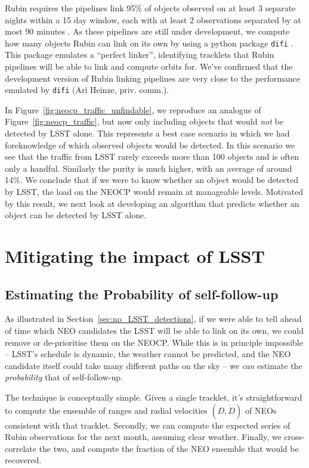 \documentclass[twocolumn]{aastex631}
\begin{document}
Rubin requires the pipelines link 95\% of objects observed on at least 3 separate nights within a 15 day window, each with at least 2 observations separated by at most 90 minutes \citep{oss}. As these pipelines are still under development, we compute how many objects Rubin can link on its own by using a python package \texttt{difi} \citep{difi}. This package emulates a ``perfect linker'', identifying tracklets that Rubin pipelines will be able to link and compute orbits for. We've confirmed that the development version of Rubin linking pipelines are very close to the performance emulated by \texttt{difi} (Ari Heinze, priv. comm.).

In Figure~\ref{fig:neocp_traffic_unfindable}, we reproduce an analogue of Figure~\ref{fig:neocp_traffic}, but now only including objects that would \emph{not} be detected by LSST alone. This represents a best case scenario in which we had foreknowledge of which observed objects would be detected. In this scenario we see that the traffic from LSST rarely exceeds more than 100 objects and is often only a handful. Similarly the purity is much higher, with an average of around 14\%. We conclude that if we were to know whether an object would be detected by LSST, the load on the NEOCP would remain at manageable levels. Motivated by this result, we next look at developing an algorithm that predicts whether an object can be detected by LSST alone.

\section{Mitigating the impact of LSST}\label{sec:mitigation}

\subsection{Estimating the Probability of self-follow-up}\label{sec:pred_alg}
As illustrated in Section~\ref{sec:no_LSST_detections}, if we were able to tell ahead of time which NEO candidates the LSST will be able to link on its own, we could remove or de-prioritise them on the NEOCP. While this is in principle impossible -- LSST's schedule is dynamic, the weather cannot be predicted, and the NEO candidate itself could take many different paths on the sky -- we \emph{can} estimate the \emph{probability} that of self-follow-up.

The technique is conceptually simple. Given a single tracklet, it's straightforward to compute the ensemble of ranges and radial velocities $(D, \dot{D})$ of NEOs consistent with that tracklet. Secondly, we can compute the expected series of Rubin observations for the next month, assuming clear weather. Finally, we cross-correlate the two, and compute the fraction of the NEO ensemble that would be recovered.
\end{document}

